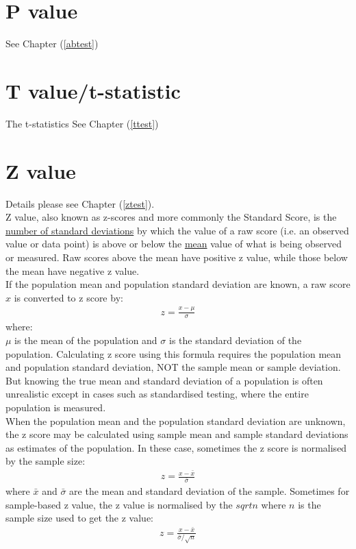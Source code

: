 \section{P value}

See Chapter (\ref{abtest})

\section{T value/t-statistic}

The t-statistics 
See Chapter (\ref{ttest})

\section{Z value}

Details please see Chapter (\ref{ztest}).\\

Z value, also known as z-scores and more commonly the Standard Score, is the \underline{number of standard deviations} by which the value of a raw score (i.e. an observed value or data point) is above or below the \underline{mean} value of what is being observed or measured. Raw scores above the mean have positive z value, while those below the mean have negative z value. \\

If the population mean and population standard deviation are known, a raw score $x$ is converted to z score by:
\begin{eqnarray}
z = \frac{x - \mu}{\sigma}
\label{zscore}
\end{eqnarray}
where:\\
$\mu$ is the mean of the population and $\sigma$ is the standard deviation of the population. Calculating z score using this formula requires the population mean and population standard deviation, NOT the sample mean or sample deviation.  But knowing the true mean and standard deviation of a population is often unrealistic except in cases such as standardised testing, where the entire population is measured. \\

When the population mean and the population standard deviation are unknown, the z score may be calculated using sample mean and sample standard deviations as estimates of the population. In these case, sometimes the z score is normalised by the sample size:
\begin{eqnarray}
z = \frac{x - \bar{x}}{\bar{\sigma}}
\label{zscorenorm}
\end{eqnarray}
where $\bar{x}$ and $\bar{\sigma}$ are the mean and standard deviation of the sample. Sometimes for sample-based z value, the z value is normalised by the $sqrt{n}$ where $n$ is the sample size used to get the z value:
\begin{eqnarray}
z = \frac{x - \bar{x}}{\bar{\sigma}/\sqrt{n}}
\label{zscorenormv1}
\end{eqnarray}

